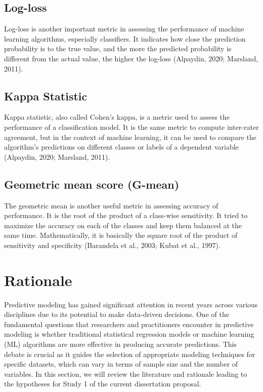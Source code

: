\documentclass[
  man]{apa7}
\begin{document}
\subsection{Log-loss}\label{log-loss}

Log-loss is another important metric in assessing the performance of machine learning algorithms, especially classifiers.
It indicates how close the prediction probability is to the true value, and the more the predicted probability is different from the actual value, the higher the log-loss (Alpaydin, 2020; Marsland, 2011).

\subsection{Kappa Statistic}\label{kappa-statistic}

Kappa statistic, also called Cohen's kappa, is a metric used to assess the performance of a classification model.
It is the same metric to compute inter-rater agreement, but in the context of machine learning, it can be used to compare the algorithm's predictions on different classes or labels of a dependent variable (Alpaydin, 2020; Marsland, 2011).

\subsection{Geometric mean score (G-mean)}\label{geometric-mean-score-g-mean}

The geometric mean is another useful metric in assessing accuracy of performance.
It is the root of the product of a class-wise sensitivity.
It tried to maximize the accuracy on each of the classes and keep them balanced at the same time.
Mathematically, it is basically the square root of the product of sensitivity and specificity (Barandela et al., 2003; Kubat et al., 1997).

\section{Rationale}\label{rationale}

Predictive modeling has gained significant attention in recent years across various disciplines due to its potential to make data-driven decisions.
One of the fundamental questions that researchers and practitioners encounter in predictive modeling is whether traditional statistical regression models or machine learning (ML) algorithms are more effective in producing accurate predictions.
This debate is crucial as it guides the selection of appropriate modeling techniques for specific datasets, which can vary in terms of sample size and the number of variables.
In this section, we will review the literature and rationale leading to the hypotheses for Study 1 of the current dissertation proposal.
\end{document}
